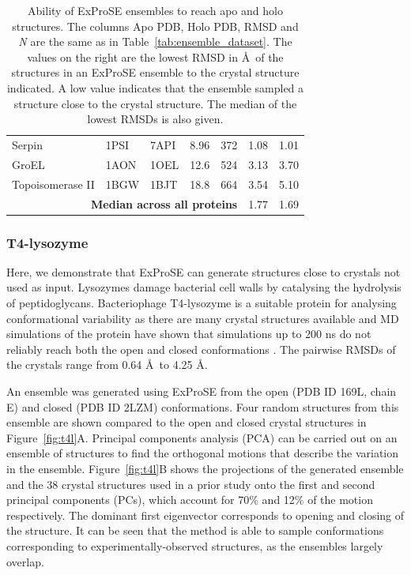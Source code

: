 \begin{table}
\begin{footnotesize}
\begin{tabular}{ r r r r r l l }
\multicolumn{1}{l}{Serpin}                    & \multicolumn{1}{l}{1PSI} & \multicolumn{1}{l}{7API} & \multicolumn{1}{l}{8.96} & \multicolumn{1}{l}{372} & 1.08  & 1.01 \\
\multicolumn{1}{l}{GroEL}                     & \multicolumn{1}{l}{1AON} & \multicolumn{1}{l}{1OEL} & \multicolumn{1}{l}{12.6} & \multicolumn{1}{l}{524} & 3.13  & 3.70 \\
\multicolumn{1}{l}{Topoisomerase II}          & \multicolumn{1}{l}{1BGW} & \multicolumn{1}{l}{1BJT} & \multicolumn{1}{l}{18.8} & \multicolumn{1}{l}{664} & 3.54  & 5.10 \\
\hline
\multicolumn{5}{r}{\textbf{Median across all proteins}} & 1.77  & 1.69 \\
\hline
\end{tabular}
\end{footnotesize}


\caption{Ability of ExProSE ensembles to reach apo and holo structures.
The columns Apo PDB, Holo PDB, RMSD and \textit{N} are the same as in Table~\ref{tab:ensemble_dataset}.
The values on the right are the lowest RMSD in \AA\ of the structures in an ExProSE ensemble to the crystal structure indicated.
A low value indicates that the ensemble sampled a structure close to the crystal structure.
The median of the lowest RMSDs is also given.}

\label{tab:ensemble_dataset_ex}
\end{table}


\subsubsection{T4-lysozyme}

Here, we demonstrate that ExProSE can generate structures close to crystals not used as input.
Lysozymes damage bacterial cell walls by catalysing the hydrolysis of peptidoglycans.
Bacteriophage T4-lysozyme is a suitable protein for analysing conformational variability as there are many crystal structures available and MD simulations of the protein have shown that simulations up to 200 ns do not reliably reach both the open and closed conformations \cite{Seeliger2007}.
The pairwise RMSDs of the crystals range from 0.64 \AA\ to 4.25 \AA.

An ensemble was generated using ExProSE from the open (PDB ID 169L, chain E) and closed (PDB ID 2LZM) conformations.
Four random structures from this ensemble are shown compared to the open and closed crystal structures in Figure~\ref{fig:t4l}A.
Principal components analysis (PCA) can be carried out on an ensemble of structures to find the orthogonal motions that describe the variation in the ensemble.
Figure~\ref{fig:t4l}B shows the projections of the generated ensemble and the 38 crystal structures used in a prior study \cite{DeGroot1998} onto the first and second principal components (PCs), which account for 70\% and 12\% of the motion respectively.
The dominant first eigenvector corresponds to opening and closing of the structure.
It can be seen that the method is able to sample conformations corresponding to experimentally-observed structures, as the ensembles largely overlap.

